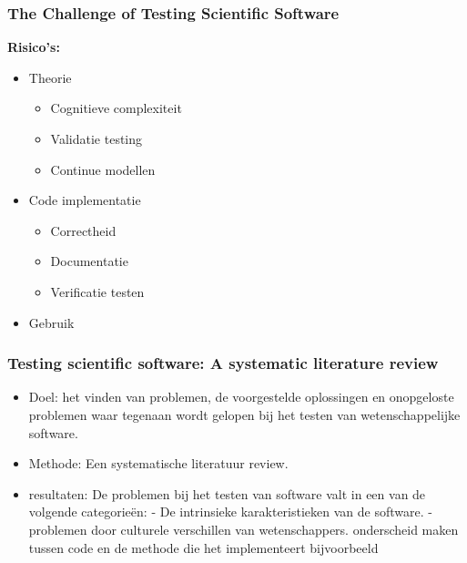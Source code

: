 \documentclass[10pt]{beamer}
\begin{document}
	\begin{frame}
		\frametitle{The Challenge of Testing Scientific Software}
		\textbf{Risico's:}
		\begin{itemize}
			\item Theorie
			\begin{itemize}
				\item Cognitieve complexiteit
				\item Validatie testing
				\item Continue modellen
			\end{itemize}
			\item Code implementatie
			\begin{itemize}
				\item Correctheid
				\item Documentatie
				\item Verificatie testen
			\end{itemize}
			\item Gebruik
		\end{itemize}
	\end{frame}

	\begin{frame}
		\frametitle{Testing scientific software: A systematic literature review}
		\begin{itemize}
			\item Doel: het vinden van problemen, de voorgestelde oplossingen en onopgeloste problemen waar tegenaan wordt gelopen bij het testen van wetenschappelijke software.
			\item Methode: Een systematische literatuur review.
			\item resultaten:
			De problemen bij het testen van software valt in een van de volgende categorieën:
			- De intrinsieke karakteristieken van de software. 
			- problemen door culturele verschillen van wetenschappers. onderscheid maken tussen code en de methode die het implementeert bijvoorbeeld
		\end{itemize} 
	\end{frame}
\end{document}
